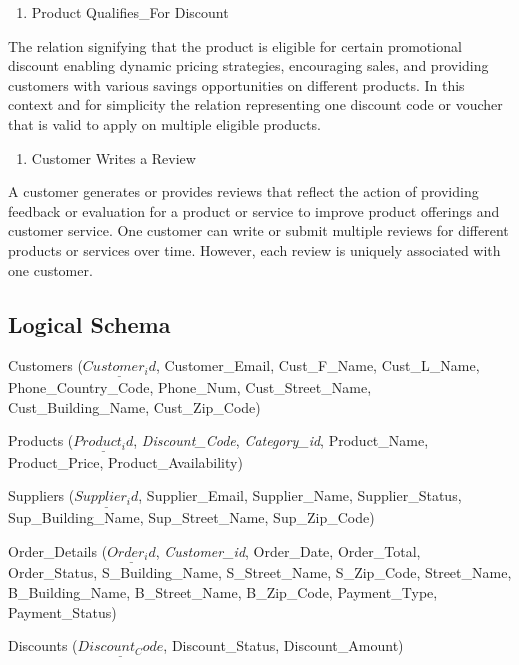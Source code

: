 \documentclass[
]{article}
\providecommand{\tightlist}{%
  \setlength{\itemsep}{0pt}\setlength{\parskip}{0pt}}
\begin{document}
\begin{enumerate}
\def\labelenumi{\arabic{enumi}.}
\setcounter{enumi}{5}
\tightlist
\item
  Product Qualifies\_For Discount
\end{enumerate}

The relation signifying that the product is eligible for certain
promotional discount enabling dynamic pricing strategies, encouraging
sales, and providing customers with various savings opportunities on
different products. In this context and for simplicity the relation
representing one discount code or voucher that is valid to apply on
multiple eligible products.

\begin{enumerate}
\def\labelenumi{\arabic{enumi}.}
\setcounter{enumi}{6}
\tightlist
\item
  Customer Writes a Review
\end{enumerate}

A customer generates or provides reviews that reflect the action of
providing feedback or evaluation for a product or service to improve
product offerings and customer service. One customer can write or submit
multiple reviews for different products or services over time. However,
each review is uniquely associated with one customer.

\hypertarget{logical-schema}{%
\subsection{Logical Schema}\label{logical-schema}}

Customers (\(\underline{Customer_id}\), Customer\_Email, Cust\_F\_Name,
Cust\_L\_Name, Phone\_Country\_Code, Phone\_Num, Cust\_Street\_Name,
Cust\_Building\_Name, Cust\_Zip\_Code)

Products (\(\underline{Product_id}\), \emph{Discount\_Code},
\emph{Category\_id}, Product\_Name, Product\_Price,
Product\_Availability)

Suppliers (\(\underline{Supplier_id}\), Supplier\_Email, Supplier\_Name,
Supplier\_Status, Sup\_Building\_Name, Sup\_Street\_Name,
Sup\_Zip\_Code)

Order\_Details (\(\underline{Order_id}\), \emph{Customer\_id},
Order\_Date, Order\_Total, Order\_Status, S\_Building\_Name,
S\_Street\_Name, S\_Zip\_Code, Street\_Name, B\_Building\_Name,
B\_Street\_Name, B\_Zip\_Code, Payment\_Type, Payment\_Status)

Discounts (\(\underline{Discount_Code}\), Discount\_Status,
Discount\_Amount)
\end{document}
